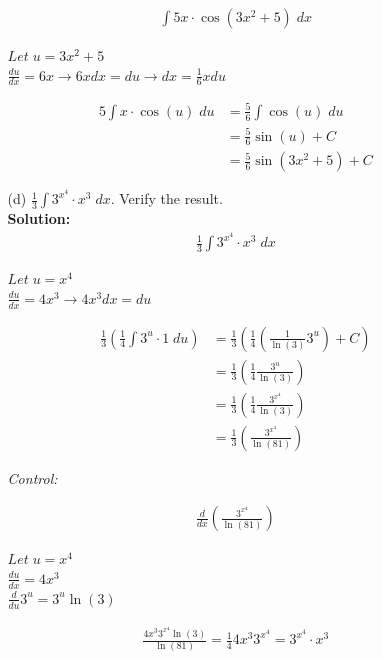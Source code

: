 \documentclass[a4paper]{article}
\begin{document}
\begin{enumerate}
\begin{enumerate}
\begin{align*}
\int 5x \cdot \cos(3x^2 + 5) \; dx
\end{align*}	

$Let \; u = 3x^2 + 5$\\ 

$\frac{du}{dx} = 6x \rightarrow 6xdx = du \rightarrow dx = \frac{1}{6}xdu$	
	
\begin{align*}
5 \int x \cdot \cos(u) \; du &= \frac{5}{6} \int \cos(u) \; du\\
&= \frac{5}{6}\sin(u) + C\\
&= \frac{5}{6} \sin(3x^2 + 5) + C
\end{align*}		
	
	
	\item[(d)] $\frac{1}{3} \int 3^{x^4} \cdot x^3 \; dx$. Verify the result.\\
	\textbf{Solution:}\\
	
\begin{align*}
\frac{1}{3} \int 3^{x^4} \cdot x^3 \; dx
\end{align*}	
	
$Let \; u = x^4$\\ 

$\frac{du}{dx} = 4x^3 \rightarrow 4x^3dx = du$	

\begin{align*}
	\frac{1}{3} (\frac{1}{4} \int 3^u \cdot 1 \; du) &= \frac{1}{3}(\frac{1}{4} (\frac{1}{\ln(3)}3^u) + C)\\
	&= \frac{1}{3}( \frac{1}{4}\frac{3^u}{\ln(3)})\\
	&= \frac{1}{3} (\frac{1}{4} \frac{3^{x^4}}{\ln(3)})\\
	&= \frac{1}{3} (\frac{3^{x^4}}{\ln(81)})
\end{align*}
	
	
\textit{Control:}	
	
\begin{align*}
	\frac{d}{dx}(\frac{3^{x^4}}{\ln(81)})
\end{align*}	
	
$Let \; u = x^4$\\ 

$\frac{du}{dx} = 4x^3$\\

$\frac{d}{du} 3^u = 3^u \ln(3)$	
	
\begin{align*}
	\frac{4x^3 3^{x^4} \ln(3)}{\ln(81)} = \frac{1}{4} 4x^3 3^{x^4} = 3^{x^4} \cdot x^3
\end{align*}	
	

\end{enumerate}
\end{enumerate}
\end{document}
